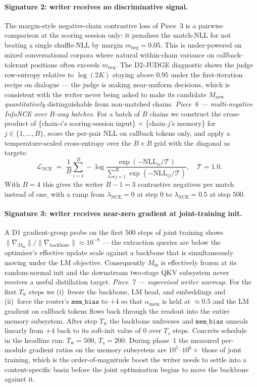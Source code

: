 \documentclass{article}
\newcommand{\amem}{\alpha_{\text{mem}}}
\begin{document}
\paragraph{Signature 2: writer receives no discriminative signal.}
The margin-style negative-chain contrastive loss of Piece~3 is
a pairwise comparison at the scoring session only: it penalises
the match-NLL for not beating a single shuffle-NLL by margin
$m_{\text{neg}}{=}0.05$. This is under-powered on mixed
conversational corpora where natural within-chain variance on
callback-tolerant positions often exceeds $m_{\text{neg}}$. The
D2-JUDGE diagnostic shows the judge row-entropy relative to
$\log(2K)$ staying above $0.95$ under the first-iteration recipe
on dialogue --- the judge is making near-uniform decisions, which
is consistent with the writer never being asked to make its
candidate $M_{\text{new}}$ \emph{quantitatively} distinguishable
from non-matched chains. \emph{Piece~6 --- multi-negative
InfoNCE over $B$-way batches.} For a batch of $B$ chains we
construct the cross-product of \{chain-$i$'s scoring-session
input\} $\times$ \{chain-$j$'s memory\} for $j \in \{1, \dots, B\}$,
score the per-pair NLL on callback tokens only, and apply a
temperature-scaled cross-entropy over the $B \times B$ grid with
the diagonal as targets:
\[
\mathcal{L}_{\text{NCE}}
 \;=\; \frac{1}{B}\sum_{i=1}^{B}
        -\log\frac{\exp(-\mathrm{NLL}_{ii}/\mathcal{T})}
                  {\sum_{j=1}^{B}\exp(-\mathrm{NLL}_{ij}/\mathcal{T})},
\quad \mathcal{T} = 1.0.
\]
With $B=4$ this gives the writer $B-1=3$ contrastive negatives per
match instead of one, with a ramp from $\lambda_{\text{NCE}}=0$ at
step $0$ to $\lambda_{\text{NCE}}=0.5$ at step $500$.

\paragraph{Signature 3: writer receives near-zero gradient at
joint-training init.} A D1 gradient-group probe on the first
$500$ steps of joint training shows $\|\nabla_{M_{\text{in}}}\| /
\|\nabla_{\text{backbone}}\| \approx 10^{-8}$ --- the extraction
queries are below the optimiser's effective update scale against
a backbone that is simultaneously moving under the LM objective.
Consequently $M_{\text{in}}$ is effectively frozen at its
random-normal init and the downstream two-stage QKV subsystem
never receives a useful distillation target. \emph{Piece~7 ---
supervised writer warmup.} For the first $T_{\text{w}}$ steps we
(i)~freeze the backbone, LM head, and embeddings and (ii)~force
the router's $\texttt{mem\_bias}$ to $+4$ so that $\amem$ is held
at $\approx 0.5$ and the LM gradient on callback tokens flows
back through the readout into the entire memory subsystem. After
step $T_{\text{w}}$ the backbone unfreezes and $\texttt{mem\_bias}$
anneals linearly from $+4$ back to its soft-init value of $0$
over $T_{\text{a}}$ steps. Concrete schedule in the headline run:
$T_{\text{w}}{=}500$, $T_{\text{a}}{=}200$. During phase~1 the
measured per-module gradient ratios on the memory subsystem are
$10^{5}$--$10^{6}\times$ those of joint training, which is the
order-of-magnitude boost the writer needs to settle into a
content-specific basin before the joint optimisation begins to
move the backbone against it.
\end{document}

